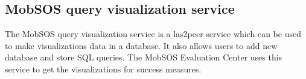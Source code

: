 \subsection{MobSOS query visualization service}
The MobSOS query visualization service is a las2peer service which can be used to make visualizations data in a database. It also allows users to add new database and store SQL queries. The MobSOS Evaluation Center uses this service to get the visualizations for success measures.












